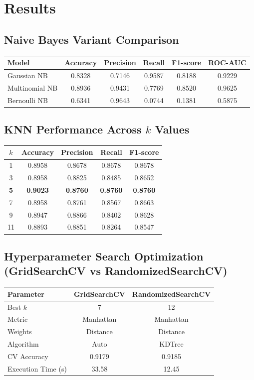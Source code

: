 \documentclass[12pt,a4paper]{article}
\begin{document}
\section{Results}

\subsection*{Naive Bayes Variant Comparison}
\begin{tabular}{lccccc}
\toprule
Model & Accuracy & Precision & Recall & F1-score & ROC-AUC \\
\midrule
Gaussian NB & 0.8328 & 0.7146 & 0.9587 & 0.8188 & 0.9229 \\
Multinomial NB & 0.8936 & 0.9431 & 0.7769 & 0.8520 & 0.9625 \\
Bernoulli NB & 0.6341 & 0.9643 & 0.0744 & 0.1381 & 0.5875 \\
\bottomrule
\end{tabular}

\subsection*{KNN Performance Across $k$ Values}
\begin{tabular}{ccccc}
\toprule
$k$ & Accuracy & Precision & Recall & F1-score \\
\midrule
1 & 0.8958 & 0.8678 & 0.8678 & 0.8678 \\
3 & 0.8958 & 0.8825 & 0.8485 & 0.8652 \\
\textbf{5} & \textbf{0.9023} & \textbf{0.8760} & \textbf{0.8760} & \textbf{0.8760} \\
7 & 0.8958 & 0.8761 & 0.8567 & 0.8663 \\
9 & 0.8947 & 0.8866 & 0.8402 & 0.8628 \\
11 & 0.8893 & 0.8851 & 0.8264 & 0.8547 \\
\bottomrule
\end{tabular}

\subsection*{Hyperparameter Search Optimization (GridSearchCV vs RandomizedSearchCV)}
\begin{tabular}{lcc}
\toprule
Parameter & GridSearchCV & RandomizedSearchCV \\
\midrule
Best $k$ & 7 & 12 \\
Metric & Manhattan & Manhattan \\
Weights & Distance & Distance \\
Algorithm & Auto & KDTree \\
CV Accuracy & 0.9179 & 0.9185 \\
Execution Time (s) & 33.58 & 12.45 \\
\bottomrule
\end{tabular}
\end{document}
